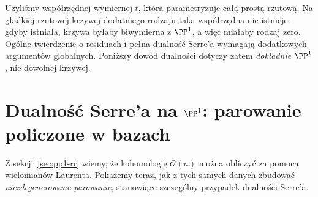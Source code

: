 \begin{uwaga}
Użyliśmy współrzędnej wymiernej $t$, która parametryzuje
całą prostą rzutową. Na gładkiej rzutowej krzywej dodatniego rodzaju taka
współrzędna nie istnieje: gdyby istniała, krzywa
byłaby biwymierna z $\PP^1$, a więc miałaby rodzaj zero. Ogólne twierdzenie o residuach i
pełna dualność Serre'a wymagają dodatkowych argumentów globalnych.
Poniższy dowód dualności dotyczy zatem \emph{dokładnie $\PP^1$},
nie dowolnej krzywej.
\end{uwaga}

\section[Dualność Serre'a na prostej rzutowej]{Dualność Serre'a na $\PP^1$: parowanie policzone w bazach}
\label{sec:serre-p1}

Z sekcji~\ref{sec:pp1-rr} wiemy, że kohomologię
$\mathcal O(n)$ można obliczyć za pomocą wielomianów Laurenta.
Pokażemy teraz, jak z tych samych danych zbudować
\emph{niezdegenerowane parowanie}, stanowiące szczególny
przypadek dualności Serre'a.

